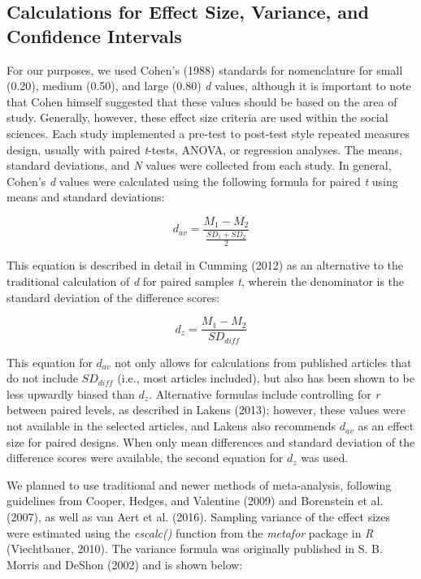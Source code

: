 \documentclass[man, mask]{apa6}
\theoremstyle{definition}
\theoremstyle{definition}
\theoremstyle{definition}
\theoremstyle{remark}
\begin{document}
\subsection{Calculations for Effect Size, Variance, and Confidence
Intervals}\label{calculations-for-effect-size-variance-and-confidence-intervals}

For our purposes, we used Cohen's (1988) standards for nomenclature for
small (0.20), medium (0.50), and large (0.80) \emph{d} values, although
it is important to note that Cohen himself suggested that these values
should be based on the area of study. Generally, however, these effect
size criteria are used within the social sciences. Each study
implemented a pre-test to post-test style repeated measures design,
usually with paired \emph{t}-tests, ANOVA, or regression analyses. The
means, standard deviations, and \emph{N} values were collected from each
study. In general, Cohen's \emph{d} values were calculated using the
following formula for paired \emph{t} using means and standard
deviations:

\[
{d_{av}} = \frac { M_1 - M_2 } { \frac { SD_1 + SD_2 } { 2 }}
\]

This equation is described in detail in Cumming (2012) as an alternative
to the traditional calculation of \emph{d} for paired samples \emph{t},
wherein the denominator is the standard deviation of the difference
scores:

\[
{d_{z}} = \frac { M_1 - M_2 } { SD_{diff} }
\]

This equation for \(d_{av}\) not only allows for calculations from
published articles that do not include \(SD_{diff}\) (i.e., most
articles included), but also has been shown to be less upwardly biased
than \(d_{z}\). Alternative formulas include controlling for \emph{r}
between paired levels, as described in Lakens (2013); however, these
values were not available in the selected articles, and Lakens also
recommends \(d_{av}\) as an effect size for paired designs. When only
mean differences and standard deviation of the difference scores were
available, the second equation for \(d_z\) was used.

We planned to use traditional and newer methods of meta-analysis,
following guidelines from Cooper, Hedges, and Valentine (2009) and
Borenstein et al. (2007), as well as van Aert et al. (2016). Sampling
variance of the effect sizes were estimated using the \emph{escalc()}
function from the \emph{metafor} package in \emph{R} (Viechtbauer,
2010). The variance formula was originally published in S. B. Morris and
DeShon (2002) and is shown below:
\end{document}
